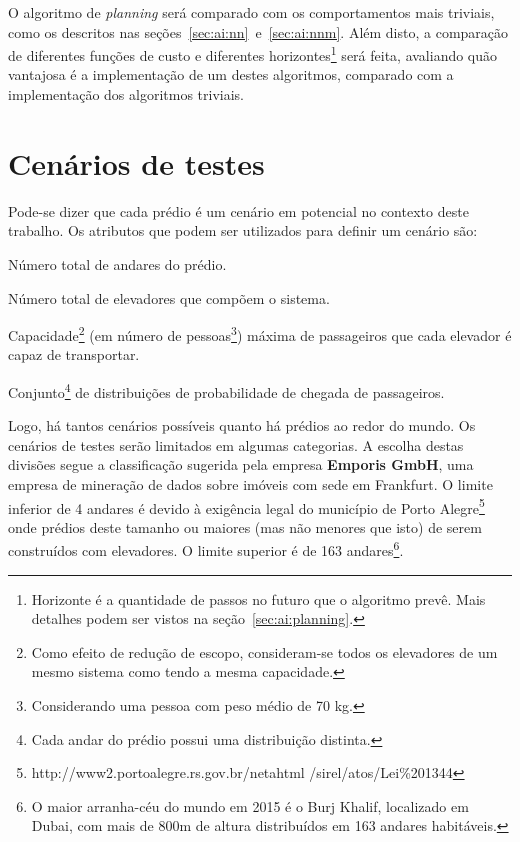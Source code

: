 O algoritmo de \textit{planning} será comparado com os comportamentos mais
triviais, como os descritos nas seções~\ref{sec:ai:nn}~e~\ref{sec:ai:nnm}. Além
disto, a comparação de diferentes funções de custo e diferentes
horizontes\footnote{Horizonte é a quantidade de passos no futuro que o algoritmo
prevê. Mais detalhes podem ser vistos na seção~\ref{sec:ai:planning}.} será
feita, avaliando quão vantajosa é a implementação de um destes algoritmos,
comparado com a implementação dos algoritmos triviais.

\section{\label{section:scenarios}Cenários de testes}

Pode-se dizer que cada prédio é um cenário em potencial no contexto deste
trabalho. Os atributos que podem ser utilizados para definir um cenário são:

\begin{description}[leftmargin=!,labelwidth=\widthof{\bfseries Pu}]
  \item[F]
  Número total de andares do prédio.
  \item[E]
  Número total de elevadores que compõem o sistema.
  \item[C]
  Capacidade\footnote{Como efeito de redução de escopo, consideram-se todos os
  elevadores de um mesmo sistema como tendo a mesma capacidade.} (em número de
  pessoas\footnote{Considerando uma pessoa com peso médio de 70 kg.}) máxima de
  passageiros que cada elevador é capaz de transportar.
  \item[D]
  Conjunto\footnote{Cada andar do prédio possui uma distribuição distinta.} de distribuições de probabilidade de chegada de passageiros.
\end{description}

Logo, há tantos cenários possíveis quanto há prédios ao redor do mundo. Os
cenários de testes serão limitados em algumas categorias. A escolha destas
divisões segue a classificação \cite{Emporis15} sugerida pela empresa
\textbf{Emporis GmbH}, uma empresa de mineração de dados sobre imóveis com sede
em Frankfurt. O limite inferior de 4 andares é devido à exigência legal do
município de Porto Alegre\footnote{http://www2.portoalegre.rs.gov.br/netahtml
/sirel/atos/Lei\%201344} onde prédios deste tamanho ou maiores (mas não menores
que isto) de serem construídos com elevadores. O limite superior é de 163
andares\footnote{O maior arranha-céu do mundo em 2015 é o Burj Khalif,
localizado em Dubai, com mais de 800m de altura distribuídos em 163 andares
habitáveis.}.

